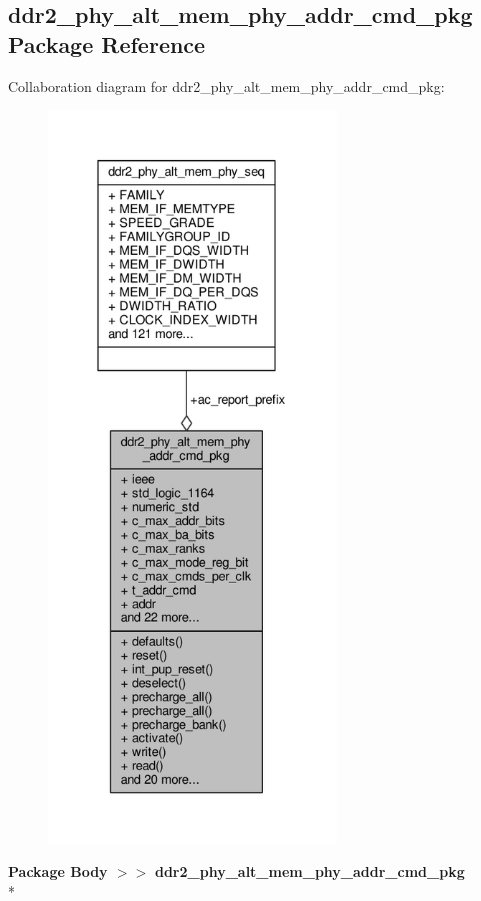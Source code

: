 \subsection{ddr2\+\_\+phy\+\_\+alt\+\_\+mem\+\_\+phy\+\_\+addr\+\_\+cmd\+\_\+pkg Package Reference}
\label{classddr2__phy__alt__mem__phy__addr__cmd__pkg}


Collaboration diagram for ddr2\+\_\+phy\+\_\+alt\+\_\+mem\+\_\+phy\+\_\+addr\+\_\+cmd\+\_\+pkg\+:\nopagebreak
\begin{figure}[H]
\begin{center}
\leavevmode
\includegraphics[height=550pt]{da/d9e/classddr2__phy__alt__mem__phy__addr__cmd__pkg__coll__graph}
\end{center}
\end{figure}
{\bfseries Package Body $>$$>$ }{\bf ddr2\+\_\+phy\+\_\+alt\+\_\+mem\+\_\+phy\+\_\+addr\+\_\+cmd\+\_\+pkg}\\*
